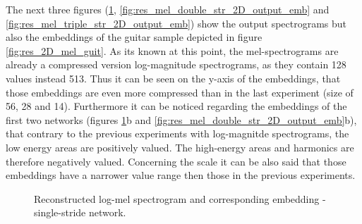 \newpage
The next three figures (\ref{fig:res_mel_single_str_2D_output_emb}, \ref{fig:res_mel_double_str_2D_output_emb} and \ref{fig:res_mel_triple_str_2D_output_emb}) show the output spectrograms but also the embeddings of the guitar sample depicted in figure \ref{fig:res_2D_mel_guit}. As its known at this point, the mel-spectrograms are already a compressed version log-magnitude spectrograms, as they contain 128 values instead 513. Thus it can be seen on the y-axis of the embeddings, that those embeddings are even more compressed than in the last experiment (size of 56, 28 and 14). Furthermore it can be noticed regarding the embeddings of the first two networks (figures \ref{fig:res_mel_single_str_2D_output_emb}b and \ref{fig:res_mel_double_str_2D_output_emb}b), that contrary to the previous experiments with log-magnitde spectrograms, the low energy areas are positively valued. The high-energy areas and harmonics are therefore negatively valued. Concerning the scale it can be also said that those embeddings have a narrower value range then those in the previous experiments. 

\begin{figure}[htb!]
    \centering
    \captionsetup{justification=centering}
    \caption{Reconstructed log-mel spectrogram and corresponding embedding - single-stride network.}
    \label{fig:res_mel_single_str_2D_output_emb}
\end{figure}

